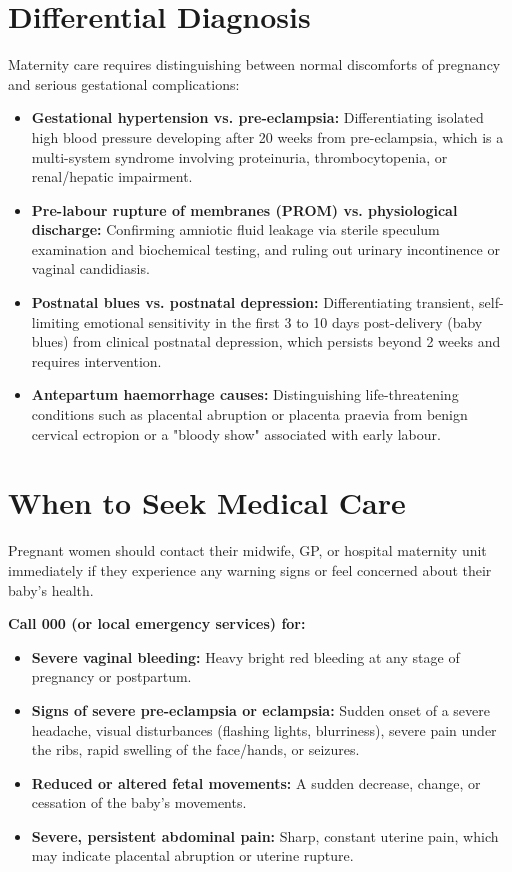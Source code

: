 \section*{Differential Diagnosis}
Maternity care requires distinguishing between normal discomforts of pregnancy and serious gestational complications:
\begin{itemize}
    \item \textbf{Gestational hypertension vs. pre-eclampsia:} Differentiating isolated high blood pressure developing after 20 weeks from pre-eclampsia, which is a multi-system syndrome involving proteinuria, thrombocytopenia, or renal/hepatic impairment.
    \item \textbf{Pre-labour rupture of membranes (PROM) vs. physiological discharge:} Confirming amniotic fluid leakage via sterile speculum examination and biochemical testing, and ruling out urinary incontinence or vaginal candidiasis.
    \item \textbf{Postnatal blues vs. postnatal depression:} Differentiating transient, self-limiting emotional sensitivity in the first 3 to 10 days post-delivery (baby blues) from clinical postnatal depression, which persists beyond 2 weeks and requires intervention.
    \item \textbf{Antepartum haemorrhage causes:} Distinguishing life-threatening conditions such as placental abruption or placenta praevia from benign cervical ectropion or a "bloody show" associated with early labour.
\end{itemize}

\section*{When to Seek Medical Care}
Pregnant women should contact their midwife, GP, or hospital maternity unit immediately if they experience any warning signs or feel concerned about their baby's health.

\textbf{Call 000 (or local emergency services) for:}
\begin{itemize}
    \item \textbf{Severe vaginal bleeding:} Heavy bright red bleeding at any stage of pregnancy or postpartum.
    \item \textbf{Signs of severe pre-eclampsia or eclampsia:} Sudden onset of a severe headache, visual disturbances (flashing lights, blurriness), severe pain under the ribs, rapid swelling of the face/hands, or seizures.
    \item \textbf{Reduced or altered fetal movements:} A sudden decrease, change, or cessation of the baby's movements.
    \item \textbf{Severe, persistent abdominal pain:} Sharp, constant uterine pain, which may indicate placental abruption or uterine rupture.
\end{itemize}

